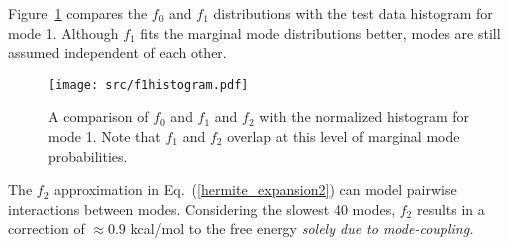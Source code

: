 \documentclass[prl,nofootinbib,twocolumn,floatfix,showpacs]{revtex4}
\begin{document}


Figure~\ref{fig:f1histogram}
compares the $f_0$ and $f_1$ distributions with the test data
histogram for mode 1.  Although $f_1$ fits the marginal mode
distributions better, modes are still assumed independent of each
other.


\begin{figure}[h]
  \texttt{[image: src/f1histogram.pdf]}
\caption{A comparison of $f_0$ and $f_1$ and $f_2$ with the normalized
  histogram for mode 1. Note that $f_1$ and $f_2$ overlap at this
  level of marginal mode probabilities.}
\label{fig:f1histogram}
\end{figure}



The $f_2$ approximation in Eq.~(\ref{hermite_expansion2}) can model
pairwise interactions between modes. 
Considering the slowest 40 modes, $f_2$ results in a correction of
$\approx 0.9$ kcal/mol to the free energy {\it solely due to
mode-coupling.}

\end{document}
